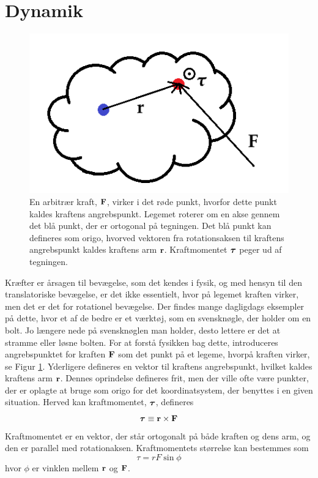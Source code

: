 \section{Dynamik}
\begin{figure}[h!]
\centering
\includegraphics[width=.37\textwidth]{RotationelMekanik/Angrebspunkt}
\caption{En arbitrær kraft, $\mathbf{F}$, virker i det røde punkt, hvorfor dette punkt kaldes kraftens angrebspunkt. Legemet roterer om en akse gennem det blå punkt, der er ortogonal på tegningen. Det blå punkt kan defineres som origo, hvorved vektoren fra rotationsaksen til kraftens angrebspunkt kaldes kraftens arm $\mathbf{r}$. Kraftmomentet $\mbox{\boldmath$ \tau $}$ peger ud af tegningen.}
\label{fig:Angrebspunkt}
\end{figure}
Kræfter er årsagen til bevægelse, som det kendes i fysik, og med hensyn til den translatoriske bevægelse, er det ikke essentielt, hvor på legemet kraften virker, men det er det for rotationel bevægelse. Der findes mange dagligdags eksempler på dette, hvor et af de bedre er et værktøj, som en svensknøgle, der holder om en bolt. Jo længere nede på svensknøglen man holder, desto lettere er det at stramme eller løsne bolten. For at forstå fysikken bag dette, introduceres angrebspunktet for kraften $\mathbf{F}$ som det punkt på et legeme, hvorpå kraften virker, se Figur \ref{fig:Angrebspunkt}. Yderligere defineres en vektor til kraftens angrebspunkt, hvilket kaldes kraftens arm $\mathbf{r}$. Dennes oprindelse defineres frit, men der ville ofte være punkter, der er oplagte at bruge som origo for det koordinatsystem, der benyttes i en given situation. Herved kan kraftmomentet, $\mbox{\boldmath$ \tau $}$, defineres
\begin{equation} \label{eq:Kraftmoment}
    \mbox{\boldmath$ {\tau} $} \equiv \mathbf{r}\times\mathbf{F}
\end{equation}
Kraftmomentet er en vektor, der står ortogonalt på både kraften og dens arm, og den er parallel med rotationaksen. Kraftmomentets størrelse kan bestemmes som
\begin{equation} \label{eq:KraftmomentNorm}
\tau = rF\sin\phi
\end{equation}
hvor $\phi$ er vinklen mellem $\mathbf{r}$ og $\mathbf{F}$.


